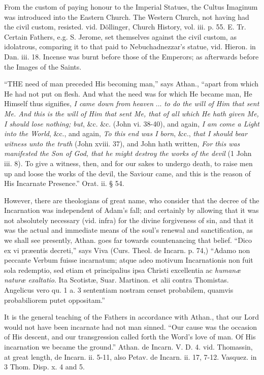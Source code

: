 From the custom of paying honour to the Imperial
Statues, the Cultus Imaginum was introduced into the Eastern Church.
The Western Church, not having had the civil custom, resisted. vid. Döllinger,
Church History, vol. iii. p. 55. E. Tr. Certain Fathers, e.g. S.
Jerome, set themselves against the civil custom, as idolatrous,
comparing it to that paid to Nebuchadnezzar's statue, vid. Hieron. in
Dan. iii. 18. Incense was burnt before those of the Emperors; as
afterwards before the Images of the Saints.



``THE
need of man preceded His becoming man,'' says Athan., ``apart from which
He had not put on flesh. And what the need was for which He became
man, He Himself thus signifies, \emph{I came down from heaven} ... \emph{to
do the will of Him that sent Me. And this is the will of Him that sent
Me, that of all which He hath given Me, I should lose nothing; but},
\&c. \&c. (John vi. 38-40), and again, \emph{I am come a Light into
the World}, \&c., and again, \emph{To this end was I born},
\&c., \emph{that I should bear witness unto the truth} (John xviii.
37), and John hath written, \emph{For this was manifested the Son of God,
that he might destroy the works of the devil} (1 John iii. 8). To
give a witness, then, and for our sakes to undergo death, to raise men
up and loose the works of the devil, the Saviour came, and this is the
reason of His Incarnate Presence.'' Orat. ii. § 54.

However, there are theologians of great name, who
consider that the decree of the Incarnation was independent of Adam's
fall; and certainly by allowing that it was not absolutely necessary (vid.
infra) for the divine forgiveness of sin, and that it was the actual
and immediate means of the soul's renewal and sanctification, as we
shall see presently, Athan. goes far towards countenancing that
belief. ``Dico ex vi præentis decreti,'' says Viva (Curs. Theol. de
Incarn. p. 74,) ``Adamo non peccante Verbum fuisse incarnatum; atque
adeo motivum Incarnationis non fuit sola redemptio, sed etiam et
principalius ipsa Christi excellentia ac \emph{humanæ naturæ exaltatio}.
Ita Scotistæ, Suar. Martinon. et alii contra Thomistas. Angelicus
vero qu. 1 a. 3 sententiam nostram censet probabilem, quamvis
probabiliorem putet oppositam.''

It is the general teaching of the Fathers in
accordance with Athan., that our Lord would not have been incarnate
had not man sinned. ``Our cause was the occasion of His descent, and
our transgression called forth the Word's love of man. Of His
incarnation we became the ground.'' Athan. de Incarn. V. D. 4. vid.
Thomassin, at great length, de Incarn. ii. 5-11, also Petav. de Incarn.
ii. 17, 7-12. Vasquez. in 3 Thom. Disp. x. 4 and 5.

